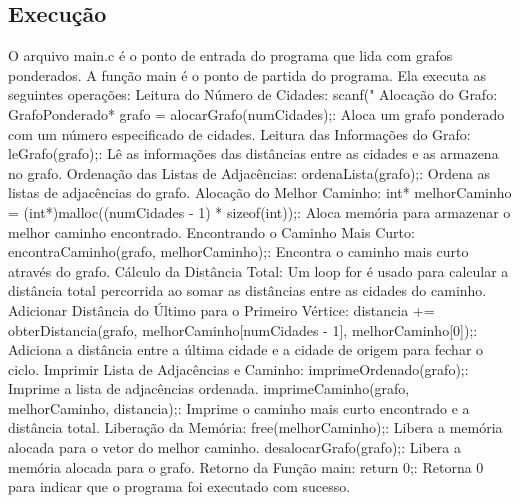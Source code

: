 \documentclass{article}
\begin{document}
\subsection{Execução}
O arquivo main.c é o ponto de entrada do programa que lida com grafos ponderados. A função main é o ponto de partida do programa. Ela executa as seguintes operações: 
Leitura do Número de Cidades:
scanf("%
Alocação do Grafo:
GrafoPonderado* grafo = alocarGrafo(numCidades);: Aloca um grafo ponderado com um número especificado de cidades.
Leitura das Informações do Grafo:
leGrafo(grafo);: Lê as informações das distâncias entre as cidades e as armazena no grafo.
Ordenação das Listas de Adjacências:
ordenaLista(grafo);: Ordena as listas de adjacências do grafo.
Alocação do Melhor Caminho: int* melhorCaminho = (int*)malloc((numCidades - 1) * sizeof(int));: Aloca memória para armazenar o melhor caminho encontrado.
Encontrando o Caminho Mais Curto: encontraCaminho(grafo, melhorCaminho);: Encontra o caminho mais curto através do grafo.
Cálculo da Distância Total: Um loop for é usado para calcular a distância total percorrida ao somar as distâncias entre as cidades do caminho.
Adicionar Distância do Último para o Primeiro Vértice: distancia += obterDistancia(grafo, melhorCaminho[numCidades - 1], melhorCaminho[0]);: Adiciona a distância entre a última cidade e a cidade de origem para fechar o ciclo.
Imprimir Lista de Adjacências e Caminho: imprimeOrdenado(grafo);: Imprime a lista de adjacências ordenada.
imprimeCaminho(grafo, melhorCaminho, distancia);: Imprime o caminho mais curto encontrado e a distância total.
Liberação da Memória: free(melhorCaminho);: Libera a memória alocada para o vetor do melhor caminho.
desalocarGrafo(grafo);: Libera a memória alocada para o grafo.
Retorno da Função main: return 0;: Retorna 0 para indicar que o programa foi executado com sucesso.
\end{document}

